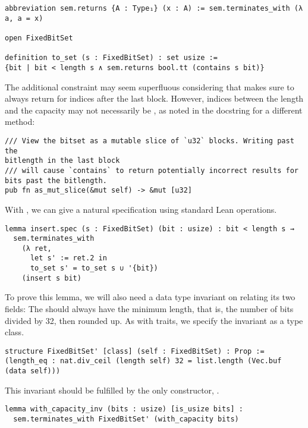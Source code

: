 \begin{verbatim}
abbreviation sem.returns {A : Type₁} (x : A) := sem.terminates_with (λ a, a = x)

open FixedBitSet

definition to_set (s : FixedBitSet) : set usize :=
{bit | bit < length s ∧ sem.returns bool.tt (contains s bit)}
\end{verbatim}

The additional constraint  may seem superfluous considering
that  makes sure to always return  for indices after
the last  block. However, indices between the length and the capacity
may not necessarily be , as noted in the docstring for a different method:

\begin{verbatim}
/// View the bitset as a mutable slice of `u32` blocks. Writing past the
bitlength in the last block
/// will cause `contains` to return potentially incorrect results for bits past the bitlength.
pub fn as_mut_slice(&mut self) -> &mut [u32]
\end{verbatim}

With , we can give  a natural specification using
standard Lean  operations.

\begin{verbatim}
lemma insert.spec (s : FixedBitSet) (bit : usize) : bit < length s →
  sem.terminates_with
    (λ ret,
      let s' := ret.2 in
      to_set s' = to_set s ∪ '{bit})
    (insert s bit)
\end{verbatim}

To prove this lemma, we will also need a data type invariant on  relating its two
fields: The  should always have the minimum length, that is, the
number of bits divided by 32, then rounded up. As with traits, we specify the
invariant as a type class.

\begin{verbatim}
structure FixedBitSet' [class] (self : FixedBitSet) : Prop :=
(length_eq : nat.div_ceil (length self) 32 = list.length (Vec.buf (data self)))
\end{verbatim}

This invariant should be fulfilled by the only constructor, .

\begin{verbatim}
lemma with_capacity_inv (bits : usize) [is_usize bits] :
  sem.terminates_with FixedBitSet' (with_capacity bits)
\end{verbatim}

